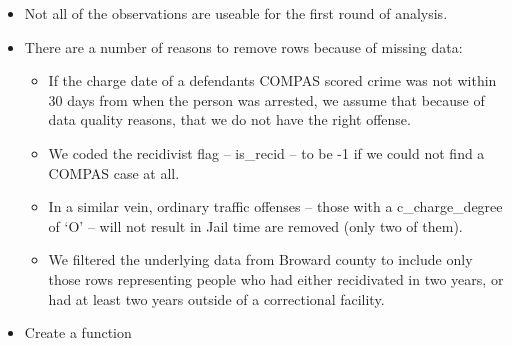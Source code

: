 \documentclass[
]{book}
\providecommand{\tightlist}{%
  \setlength{\itemsep}{0pt}\setlength{\parskip}{0pt}}
\begin{document}
\begin{itemize}
\tightlist
\item
  Not all of the observations are useable for the first round of analysis.
\item
  There are a number of reasons to remove rows because of missing data:

  \begin{itemize}
  \tightlist
  \item
    If the charge date of a defendants COMPAS scored crime was not within 30 days from when the person was arrested, we assume that because of data quality reasons, that we do not have the right offense.
  \item
    We coded the recidivist flag -- is\_recid -- to be -1 if we could not find a COMPAS case at all.
  \item
    In a similar vein, ordinary traffic offenses -- those with a c\_charge\_degree of `O' -- will not result in Jail time are removed (only two of them).
  \item
    We filtered the underlying data from Broward county to include only those rows representing people who had either recidivated in two years, or had at least two years outside of a correctional facility.
  \end{itemize}
\item
  Create a function
\end{itemize}
\end{document}
